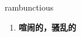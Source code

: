
\begin{frame}
{\huge rambunctious}
\begin{center}
\begin{enumerate}\Large
  \item \textbf{喧闹的，骚乱的}
\end{enumerate}
\end{center}
\end{frame}
